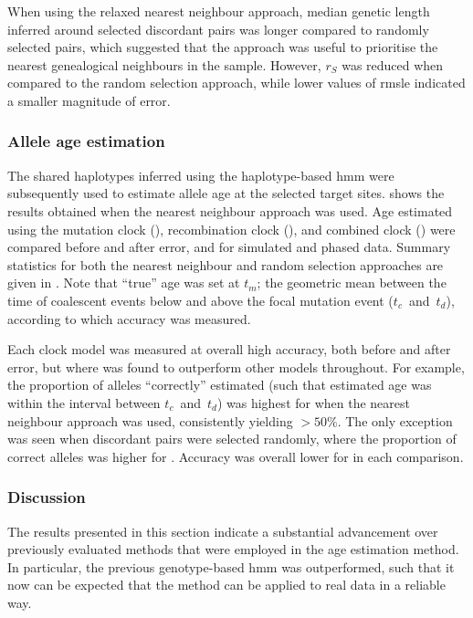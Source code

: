When using the relaxed nearest neighbour approach, median genetic length inferred around selected discordant pairs was longer compared to randomly selected pairs, which suggested that the approach was useful to prioritise the nearest genealogical neighbours in the sample.
However, $r_S$ was reduced when compared to the random selection approach, while lower values of \gls{rmsle} indicated a smaller magnitude of error.



%
\subsubsection{Allele age estimation}
%

The shared haplotypes inferred using the haplotype-based \gls{hmm} were subsequently used to estimate allele age at the selected target sites.
 shows the results obtained when the nearest neighbour approach was used.
Age estimated using the mutation clock (\ClockM), recombination clock (\ClockR), and combined clock (\ClockC) were compared before and after error, and for simulated and phased data.
Summary statistics for both the nearest neighbour and random selection approaches are given in .
Note that ``true'' age was set at $t_m$; \ie the geometric mean between the time of coalescent events below and above the focal mutation event ($t_c$~and~$t_d$), according to which accuracy was measured.

%

%

Each clock model was measured at overall high accuracy, both before and after error, but where \ClockC was found to outperform other models throughout.
For example, the proportion of alleles ``correctly'' estimated (such that estimated age was within the interval between $t_c$~and~$t_d$) was highest for \ClockC when the nearest neighbour approach was used, consistently yielding $>50\%$.
The only exception was seen when discordant pairs were selected randomly, where the proportion of correct alleles was higher for \ClockR.
Accuracy was overall lower for \ClockM in each comparison.

%

%

%
\subsubsection{Discussion}
%

The results presented in this section indicate a substantial advancement over previously evaluated methods that were employed in the age estimation method.
In particular, the previous genotype-based \gls{hmm} was outperformed, such that it now can be expected that the method can be applied to real data in a reliable way.


